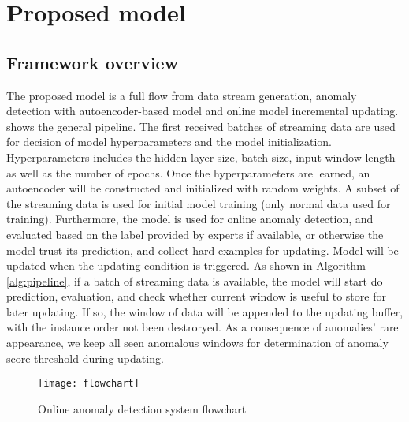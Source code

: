 \chapter{Proposed model}
\label{chap:Proposedmodel}

\section{Framework overview}
\label{sec:framework}

The proposed model is a full flow from data stream generation, anomaly detection with autoencoder-based model and online model incremental updating.  shows the general pipeline. The first received batches of streaming data are used for decision of model hyperparameters and the model initialization. Hyperparameters includes the hidden layer size, batch size, input window length as well as the number of epochs. Once the hyperparameters are learned, an autoencoder will be constructed and initialized with random weights. A subset of the streaming data is used for initial model training (only normal data used for training). Furthermore, the model is used for online anomaly detection, and evaluated based on the label provided by experts if available, or otherwise the model trust its prediction, and collect hard examples for updating. Model will be updated when the updating condition is triggered. As shown in Algorithm \ref{alg:pipeline}, if a batch of streaming data is available, the model will start do prediction, evaluation, and check whether current window is useful to store for later updating. If so, the window of data will be appended to the updating buffer, with the instance order not been destroryed. As a consequence of anomalies' rare appearance, we keep all seen anomalous windows for determination of anomaly score threshold during updating. 


\begin{figure}[h]
\centering
\texttt{[image: flowchart]}
\caption[Online anomaly detection system flowchart]{Online anomaly detection system flowchart}
\label{fig:flowchart}
\end{figure}

